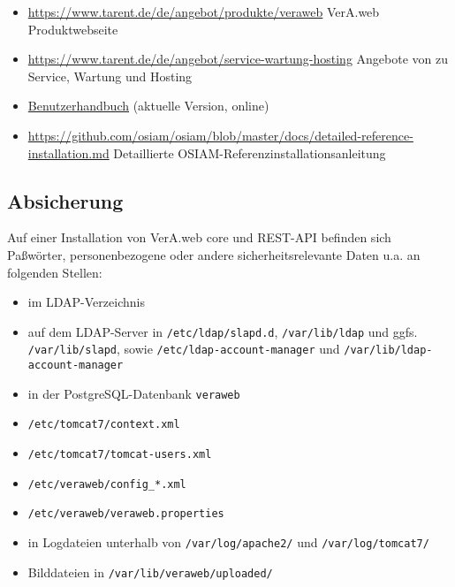 \begin{itemize}
 \item{\href{https://www.tarent.de/de/angebot/produkte/veraweb}{https://www.tarent.de/de/angebot/produkte/veraweb}
  \dash VerA.web Produktwebseite}
 \item{\href{https://www.tarent.de/de/angebot/service-wartung-hosting}{https://www.tarent.de/de/angebot/service-wartung-hosting}
  \dash Angebote von  zu\\
  Service, Wartung und Hosting}
 \item{\href{https://evolvis.org/plugins/scmgit/cgi-bin/gitweb.cgi?p=veraweb/veraweb.git;a=blob_plain;f=src/main/webapp/doc/Benutzerhandbuch.pdf;hb=HEAD}{Benutzerhandbuch}
  (aktuelle Version, online)}
\ifoa
 \item{\href{https://github.com/osiam/osiam/blob/master/docs/detailed-reference-installation.md}{https://github.com/osiam/osiam/blob/master/docs/detailed-reference-installation.md}
  \dash Detaillierte OSIAM-Referenzinstallationsanleitung}
\fi%
\end{itemize}

\subsection{Absicherung}\label{subsec:links-sec}

Auf einer Installation von VerA.web core und REST-API befinden sich
Paßwörter, personenbezogene oder andere sicherheitsrelevante Daten
u.a. an folgenden Stellen:\keinumbruch

\begin{itemize}
 \item{im LDAP-Verzeichnis}
 \item{auf dem LDAP-Server in \texttt{/etc/ldap/slapd.d},
  \texttt{/var/lib/ldap} und ggfs. \texttt{/var/lib/slapd},
  sowie \texttt{/etc/ldap-account-manager} und
  \texttt{/var/lib/ldap-account-manager}}
 \item{in der PostgreSQL-Datenbank \texttt{veraweb}}
 \item{\texttt{/etc/tomcat7/context.xml}}
 \item{\texttt{/etc/tomcat7/tomcat-users.xml}}
 \item{\texttt{/etc/veraweb/config\_*.xml}}
 \item{\texttt{/etc/veraweb/veraweb.properties}}
 \item{in Logdateien unterhalb von \texttt{/var/log/apache2/}
  und \texttt{/var/log/tomcat7/}}
 \item{Bilddateien in \texttt{/var/lib/veraweb/uploaded/}}
\end{itemize}


